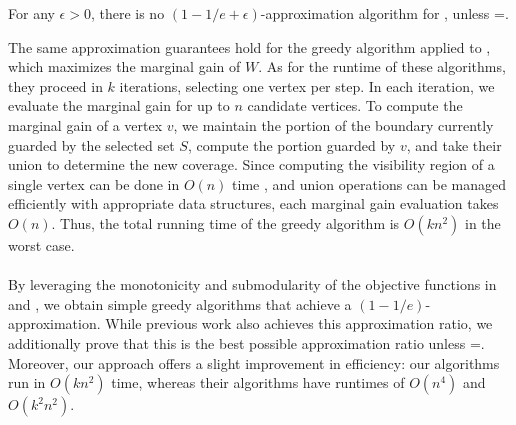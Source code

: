 \begin{theorem}
    For any $\epsilon>0$, there is no $(1-1/e+\epsilon)$-approximation algorithm for \MLVG{}, unless =.
\end{theorem}
\noindent
The same approximation guarantees hold for the greedy algorithm applied to \MVVG{}, which maximizes the marginal gain of $W$. As for the runtime of these algorithms, they proceed in $k$ iterations, selecting one vertex per step. In each iteration, we evaluate the marginal gain for up to $n$ candidate vertices. To compute the marginal gain of a vertex $v$, we maintain the portion of the boundary currently guarded by the selected set $S$, compute the portion guarded by $v$, and take their union to determine the new coverage. Since computing the visibility region of a single vertex can be done in $O(n)$ time \cite{visibility}, and union operations can be managed efficiently with appropriate data structures, each marginal gain evaluation takes $O(n)$. Thus, the total running time of the greedy algorithm is $O(kn^2)$ in the worst case.\\\\
By leveraging the monotonicity and submodularity of the objective functions in \MLVG{} and \MVVG{}, we obtain simple greedy algorithms that achieve a $(1-1/e)$-approximation. While previous work \cite{fragoudakis-boundary,fragoudakis-interior,fragoudakis-paintings} also achieves this approximation ratio, we additionally prove that this is the best possible approximation ratio unless =. Moreover, our approach offers a slight improvement in efficiency: our algorithms run in $O(kn^2)$ time, whereas their algorithms have runtimes of $O(n^4)$ and $O(k^2n^2)$.